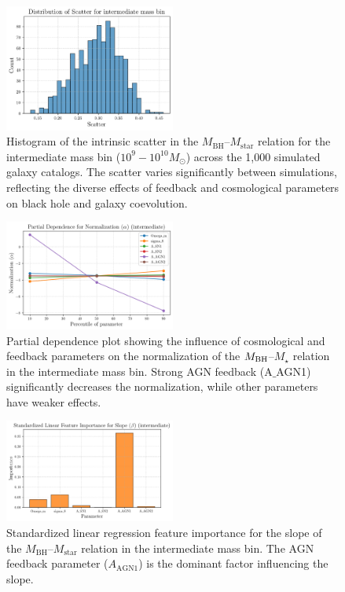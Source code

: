 \documentclass[twocolumn]{aastex631}
\begin{document}
\begin{figure}[ht!]
    \centering
    \includegraphics[width=0.5\textwidth]{../Project5/plots/dist_scatter_intermediate_44_20250423_182545.png}
    \caption{Histogram of the intrinsic scatter in the $M_\mathrm{BH}$–$M_\mathrm{star}$ relation for the intermediate mass bin ($10^9-10^{10} M_\odot$) across the 1,000 simulated galaxy catalogs. The scatter varies significantly between simulations, reflecting the diverse effects of feedback and cosmological parameters on black hole and galaxy coevolution.
}
    \label{fig:dist_scatter_intermediate}
\end{figure}

\begin{figure}[ht!]
    \centering
    \includegraphics[width=0.5\textwidth]{../Project5/plots/pdp_Normalization_alpha_intermediate_74_20250423_182559.png}
    \caption{Partial dependence plot showing the influence of cosmological and feedback parameters on the normalization of the $M_{\rm BH}$–$M_{\star}$ relation in the intermediate mass bin. Strong AGN feedback (A\ensuremath{\_}AGN1) significantly decreases the normalization, while other parameters have weaker effects.
}
    \label{fig:pdp_norm_intermediate}
\end{figure}

\begin{figure}[ht!]
    \centering
    \includegraphics[width=0.5\textwidth]{../Project5/plots/featimp_StandardizedLinear_Slope_beta_intermediate_70_20250423_182558.png}
    \caption{Standardized linear regression feature importance for the slope of the $M_\mathrm{BH}$–$M_\mathrm{star}$ relation in the intermediate mass bin. The AGN feedback parameter ($A_\mathrm{AGN1}$) is the dominant factor influencing the slope.
}
    \label{fig:featimp_slope_linear_intermediate}
\end{figure}
\end{document}
